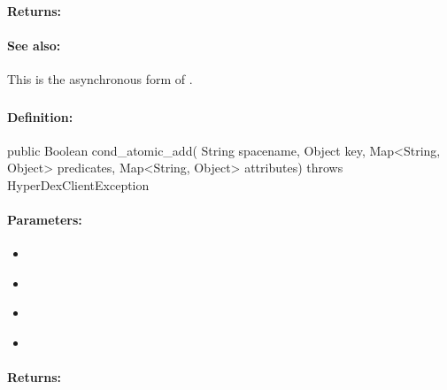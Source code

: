 \paragraph{Returns:}


\paragraph{See also:}  This is the asynchronous form of .

\pagebreak
\subsubsection{}
\label{api:java:cond_atomic_add}


\paragraph{Definition:}
\begin{javacode}
public Boolean cond_atomic_add(
        String spacename,
        Object key,
        Map<String, Object> predicates,
        Map<String, Object> attributes) throws HyperDexClientException
\end{javacode}

\paragraph{Parameters:}
\begin{itemize}[noitemsep]
\item {}\\

\item {}\\

\item {}\\

\item {}\\

\end{itemize}

\paragraph{Returns:}


